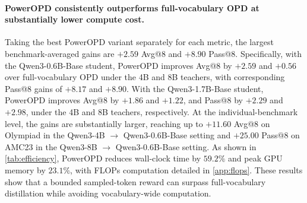     

\paragraph{PowerOPD consistently outperforms full-vocabulary OPD at substantially lower compute cost.}
Taking the best PowerOPD variant separately for each metric, the largest benchmark-averaged gains are \(\mathbf{+2.59}\) Avg@8 and \(\mathbf{+8.90}\) Pass@8. Specifically, with the Qwen3-0.6B-Base student, PowerOPD improves Avg@8 by \(+2.59\) and \(+0.56\) over full-vocabulary OPD under the 4B and 8B teachers, with corresponding Pass@8 gains of \(+8.17\) and \(+8.90\). With the Qwen3-1.7B-Base student, PowerOPD improves Avg@8 by \(+1.86\) and \(+1.22\), and Pass@8 by \(+2.29\) and \(+2.98\), under the 4B and 8B teachers, respectively. At the individual-benchmark level, the gains are substantially larger, reaching up to \(\mathbf{+11.60}\) Avg@8 on Olympiad in the Qwen3-4B \(\to\) Qwen3-0.6B-Base setting and \(\mathbf{+25.00}\) Pass@8 on AMC23 in the Qwen3-8B \(\to\) Qwen3-0.6B-Base setting. As shown in \autoref{tab:efficiency}, PowerOPD reduces wall-clock time by \(59.2\%\) and peak GPU memory by \(23.1\%\), with FLOPs computation detailed in \autoref{app:flops}. These results show that a bounded sampled-token reward can surpass full-vocabulary distillation while avoiding vocabulary-wide computation.
 
